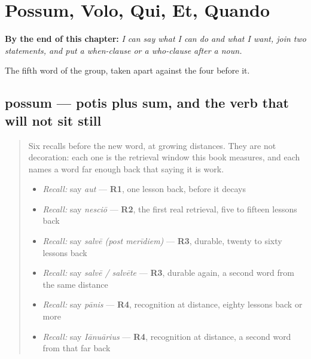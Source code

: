 
\chapter{Possum, Volo, Qui, Et, Quando}
\label{ch:la-formae}

\begin{chapteropening}
\textbf{By the end of this chapter:} \emph{I can say what I can do and what I want, join two statements, and put a when-clause or a who-clause after a noun.}

The fifth word of the group, taken apart against the four before it.
\end{chapteropening}

\section[possum, posse]{possum — potis plus sum, and the verb that will not sit still}

\label{lesson:LA-C49-possum}



\begin{quote}
Six recalls before the new word, at growing distances. They are not decoration: each one is the retrieval window this book measures, and each names a word far enough back that saying it is work.

\begin{itemize}
\raggedright
  \item \emph{Recall:} say \emph{aut} — \textbf{R1}, one lesson back, before it decays
  \item \emph{Recall:} say \emph{nesciō} — \textbf{R2}, the first real retrieval, five to fifteen lessons back
  \item \emph{Recall:} say \emph{salvē (post merīdiem)} — \textbf{R3}, durable, twenty to sixty lessons back
  \item \emph{Recall:} say \emph{salvē / salvēte} — \textbf{R3}, durable again, a second word from the same distance
  \item \emph{Recall:} say \emph{pānis} — \textbf{R4}, recognition at distance, eighty lessons back or more
  \item \emph{Recall:} say \emph{Iānuārius} — \textbf{R4}, recognition at distance, a second word from that far back
\end{itemize}
\end{quote}

